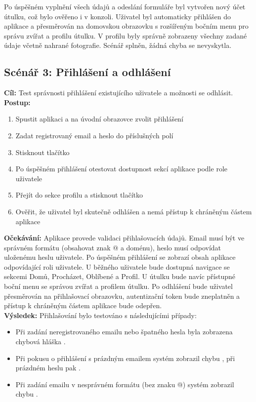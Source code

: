 \documentclass[czech, bp, kiv, he, iso690numb, pdf]{fasthesis}
\begin{document}
    Po úspěšném vyplnění všech údajů a odeslání formuláře byl vytvořen nový účet útulku, což bylo ověřeno i v  konzoli. Uživatel byl automaticky přihlášen do aplikace a přesměrován na domovskou obrazovku s rozšířeným bočním menu pro správu zvířat a profilu útulku. V profilu byly správně zobrazeny všechny zadané údaje včetně nahrané fotografie. Scénář splněn, žádná chyba se nevyskytla.



    \subsection*{Scénář 3: Přihlášení a odhlášení}

    \textbf{Cíl:} Test správnosti přihlášení existujícího uživatele a možnosti se odhlásit.\\

    \noindent \textbf{Postup:}
    \begin{enumerate}
        \item Spustit aplikaci a na úvodní obrazovce zvolit přihlášení
        \item Zadat registrovaný email a heslo do příslušných polí
        \item Stisknout tlačítko 
        \item Po úspěšném přihlášení otestovat dostupnost sekcí aplikace podle role uživatele
        \item Přejít do sekce profilu a stisknout tlačítko 
        \item Ověřit, že uživatel byl skutečně odhlášen a nemá přístup k chráněným částem aplikace
    \end{enumerate}

    \noindent \textbf{Očekávání:} Aplikace provede validaci přihlašovacích údajů. Email musí být ve správném formátu (obsahovat znak @ a doménu), heslo musí odpovídat uloženému heslu uživatele. Po úspěšném přihlášení se zobrazí obsah aplikace odpovídající roli uživatele. U běžného uživatele bude dostupná navigace se sekcemi Domů, Procházet, Oblíbené a Profil. U útulku bude navíc přístupné boční menu se správou zvířat a profilem útulku. Po odhlášení bude uživatel přesměrován na přihlašovací obrazovku, autentizační token bude zneplatněn a přístup k chráněným částem aplikace bude odepřen.\\

    \noindent \textbf{Výsledek:}
    Přihlašování bylo testováno s následujícími případy:
    \begin{itemize}
        \item Při zadání neregistrovaného emailu nebo špatného hesla byla zobrazena chybová hláška .
        \item Při pokusu o přihlášení s prázdným emailem systém zobrazil chybu , při prázdném heslu pak .
        \item Při zadání emailu v nesprávném formátu (bez znaku @) systém zobrazil chybu .
    \end{itemize}
\end{document}
